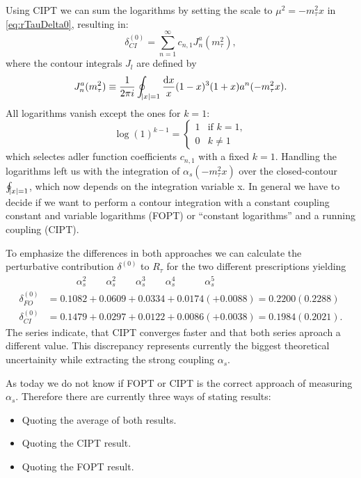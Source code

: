 \documentclass[../../index.tex]{subfiles}
\begin{document}
Using CIPT we can sum the logarithms by setting the scale to
$\mu^2 = -m_\tau^2 x$ in \cref{eq:rTauDelta0}, resulting in:
\begin{equation}
  \delta^{(0)}_{CI} = \sum_{n=1}^\infty c_{n,1} J_n^a(m_\tau^2),
\end{equation}
where the contour integrals $J_l$ are defined by
\begin{equation}
  J_n^a(m_\tau^2) \equiv \frac{1}{2 \pi i} \oint_{\abs{x}=1} \frac{\dif x}{x} (1-x)^3(1+x) a^n(-m_\tau^2 x).
\end{equation}
All logarithms vanish except the ones for $k=1$:
\begin{equation}
  \log(1)^{k-1} =  \begin{cases} \mbox{1} & \mbox{if } k=1, \\ \mbox{0} & k\neq 1 \end{cases}
\end{equation}
which selectes adler function coefficients $c_{n,1}$ with a fixed $k=1$. Handling the
logarithms left us with the integration of $\alpha_s(- m_\tau^2 x)$ over the closed-contour $\oint_{\abs{x}=1}$, which now
depends on the integration variable x. In general we have to decide if we want
to perform a contour integration with a constant coupling constant and variable
logarithms (FOPT) or ``constant logarithms'' and a running coupling (CIPT).

To emphasize the differences in both approaches we can calculate the
perturbative contribution $\delta^{(0)}$ to $R_\tau$ for the two different
prescriptions yielding \cite{Beneke2008}
\begin{align}
  & \quad\qquad \alpha_s^2 \qquad \alpha_s^2 \qquad \alpha_s^3 \qquad \alpha_s^4 \quad\qquad \alpha_s^5 \nonumber\\
  \delta_{FO}^{(0)} &= 0.1082 + 0.0609 + 0.0334 + 0.0174 (+ 0.0088) = 0.2200 (0.2288) \\
  \delta_{CI}^{(0)} &= 0.1479 + 0.0297 + 0.0122 + 0.0086 (+ 0.0038) = 0.1984 (0.2021).
\end{align}
The series indicate, that CIPT converges faster and that both series aproach a
different value. This discrepancy represents currently the biggest theoretical
uncertainity while extracting the strong coupling $\alpha_s$.

As today we do not know if FOPT or CIPT is the correct approach of
measuring $\alpha_s$. Therefore there are currently three ways of stating
results:
\begin{itemize}
  \item Quoting the average of both results.
  \item Quoting the CIPT result.
  \item Quoting the FOPT result.
\end{itemize}
\end{document}
